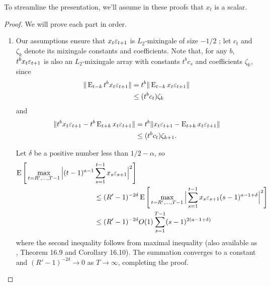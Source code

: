 \documentclass[12pt,fleqn]{article}
\begin{document}
\noindent%
To streamline the
presentation, we'll assume in these proofs that $x_t$ is a scalar.
\begin{proof}
  We will prove each part in order.
  \begin{enumerate}
  \item Our assumptions ensure that $x_t \varepsilon_{t+1}$ is $L_2$-mixingale
    of size $-1/2$ \citep[see Theorem 17.5 of][]{Dav:94}; let $c_t$
    and $\zeta_k$ denote its mixingale
    constants and coefficients. Note that, for any $b$, $t^{b} x_t \varepsilon_{t+1}$ is
    also an $L_2$-mixingale array with constants $t^{b} c_s$ and
    coefficients $\zeta_k$, since
    \begin{align*}
      \| \operatorname{E}_{t-k} t^{b} x_t \varepsilon_{t+1} \| &= t^{b} \| \operatorname{E}_{t-k} x_t \varepsilon_{t+1} \| \\
      &\leq (t^{b} c_t) \zeta_k
    \end{align*}
    and
    \begin{align*}
      \| t^{b} x_t \varepsilon_{t+1} - t^{b} \operatorname{E}_{t+k} x_t \varepsilon_{t+1} \| &= t^{b} \|  x_t \varepsilon_{t+1} - \operatorname{E}_{t+k} x_t \varepsilon_{t+1} \| \\
      &\leq (t^{b} c_t) \zeta_{k+1}.
    \end{align*}

    Let $\delta$ be a positive number less than $1/2 - \alpha$, so
    \begin{align*}
      \operatorname{E}\Bigg[\max_{t=R',\dots,T-1} \Big|(t-1)^{a-1} & \sum_{s=1}^{t-1} x_s \varepsilon_{s+1} \Big|^2\Bigg] \\
      &\leq (R'-1)^{-2\delta} \operatorname{E}\Bigg[\max_{t=R',\dots,T-1} \Big| \sum_{s=1}^{t-1} x_s \varepsilon_{s+1} (s-1)^{a-1+\delta} \Big|^2\Bigg] \\
      &\leq (R'-1)^{-2\delta} O(1) \sum_{s=1}^{T-1} (s-1)^{2(a - 1 + \delta)}
    \end{align*}
    where the second inequality follows from  maximal
    inequality (also available as \citealp{Dav:94}, Theorem 16.9 and
    Corollary 16.10). The summation converges to a constant and
    $(R'-1)^{-2\delta} \to 0$ as $T \to \infty$, completing the proof.


\end{enumerate}
\end{proof}
\end{document}
